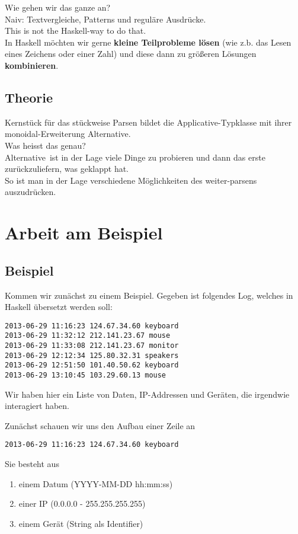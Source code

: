 \documentclass{beamer}
\begin{document}
\begin{frame}[fragile]
\large Wie gehen wir das ganze an?\\
\normalsize Naiv: Textvergleiche, Patterns und reguläre Ausdrücke.\\
\bigskip
\pause
This is not the Haskell-way to do that.\\
\bigskip
\pause
In Haskell möchten wir gerne \textbf{kleine Teilprobleme lösen} (wie z.b. das Lesen eines Zeichens oder einer Zahl) und diese dann zu größeren Lösungen \textbf{kombinieren}.
\end{frame}

\subsection{Theorie}
\begin{frame}[fragile]
Kernstück für das stückweise Parsen bildet die Applicative-Typklasse mit ihrer monoidal-Erweiterung \glqq Alternative\grqq .\\
\pause
\bigskip
Was heisst das genau?\\
\bigskip
\pause
\glqq Alternative\grqq \  ist in der Lage viele Dinge zu probieren und dann das erste zurückzuliefern, was geklappt hat.\\
So ist man in der Lage verschiedene Möglichkeiten des weiter-parsens auszudrücken.
\end{frame}

\section{Arbeit am Beispiel}
\subsection{Beispiel}
\begin{frame}[fragile]
Kommen wir zunächst zu einem Beispiel. Gegeben ist folgendes Log, welches in Haskell übersetzt werden soll:
\small
\begin{verbatim}
2013-06-29 11:16:23 124.67.34.60 keyboard
2013-06-29 11:32:12 212.141.23.67 mouse
2013-06-29 11:33:08 212.141.23.67 monitor
2013-06-29 12:12:34 125.80.32.31 speakers
2013-06-29 12:51:50 101.40.50.62 keyboard
2013-06-29 13:10:45 103.29.60.13 mouse
\end{verbatim}
\normalsize
Wir haben hier ein Liste von Daten, IP-Addressen und Geräten, die irgendwie interagiert haben.
\end{frame}

\begin{frame}[fragile]
Zunächst schauen wir uns den Aufbau einer Zeile an
\begin{verbatim}
2013-06-29 11:16:23 124.67.34.60 keyboard
\end{verbatim}
\pause
Sie besteht aus
\begin{enumerate}
 \item einem Datum (YYYY-MM-DD hh:mm:ss)
 \item einer IP (0.0.0.0 - 255.255.255.255)
 \item einem Gerät (String als Identifier)
\end{enumerate}
\end{frame}
\end{document}
